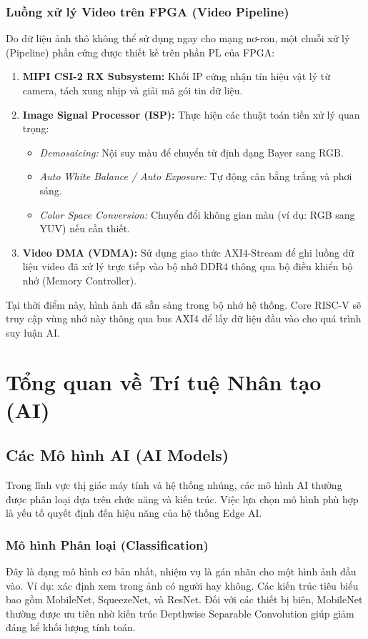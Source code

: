 \subsubsection{Luồng xử lý Video trên FPGA (Video Pipeline)}
Do dữ liệu ảnh thô không thể sử dụng ngay cho mạng nơ-ron, một chuỗi xử lý (Pipeline) phần cứng được thiết kế trên phần PL của FPGA:
\begin{enumerate}
    \item \textbf{MIPI CSI-2 RX Subsystem:} Khối IP cứng nhận tín hiệu vật lý từ camera, tách xung nhịp và giải mã gói tin dữ liệu.
    \item \textbf{Image Signal Processor (ISP):} Thực hiện các thuật toán tiền xử lý quan trọng:
        \begin{itemize}
            \item \textit{Demosaicing:} Nội suy màu để chuyển từ định dạng Bayer sang RGB.
            \item \textit{Auto White Balance / Auto Exposure:} Tự động cân bằng trắng và phơi sáng.
            \item \textit{Color Space Conversion:} Chuyển đổi không gian màu (ví dụ: RGB sang YUV) nếu cần thiết.
        \end{itemize}
    \item \textbf{Video DMA (VDMA):} Sử dụng giao thức AXI4-Stream để ghi luồng dữ liệu video đã xử lý trực tiếp vào bộ nhớ DDR4 thông qua bộ điều khiển bộ nhớ (Memory Controller).
\end{enumerate}

Tại thời điểm này, hình ảnh đã sẵn sàng trong bộ nhớ hệ thống. Core RISC-V sẽ truy cập vùng nhớ này thông qua bus AXI4 để lấy dữ liệu đầu vào cho quá trình suy luận AI.
%
\newpage
\section{Tổng quan về Trí tuệ Nhân tạo (AI)}
\label{sec:ai_overview}

\subsection{Các Mô hình AI (AI Models)}
Trong lĩnh vực thị giác máy tính và hệ thống nhúng, các mô hình AI thường được phân loại dựa trên chức năng và kiến trúc. Việc lựa chọn mô hình phù hợp là yếu tố quyết định đến hiệu năng của hệ thống Edge AI.

\subsubsection{Mô hình Phân loại (Classification)}
Đây là dạng mô hình cơ bản nhất, nhiệm vụ là gán nhãn cho một hình ảnh đầu vào. Ví dụ: xác định xem trong ảnh có người hay không. Các kiến trúc tiêu biểu bao gồm MobileNet, SqueezeNet, và ResNet. Đối với các thiết bị biên, MobileNet thường được ưu tiên nhờ kiến trúc Depthwise Separable Convolution giúp giảm đáng kể khối lượng tính toán.

